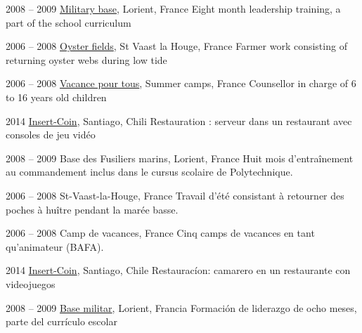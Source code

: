 \item[Commandos Marine]{2008 -- 2009}
  {
  \href{http://www.defense.gouv.fr/marine/organisation/forces/fusiliers-marins-et-commandos/force-maritime-des-fusiliers-marins-et-commandos}{Military base}, Lorient, France
  }
  {Eight ­month leadership training, a part of the school curriculum}


\item[Ostreiculture]{2006 -- 2008}
  {
  \href{http://huitresdesaintvaast.fr/}{Oyster fields}, St Vaast la Houge, France
  }
  {Farmer work consisting of returning oyster webs during low tide}


\item[Counsellor]{2006 -- 2008}
  {
  \href{http://www.vacances-pour-tous.org/}{Vacance pour tous}, Summer camps, France
  }
  {Counsellor in charge of 6 to 16 years old children}


\item[Serveur-Barman]{2014}
	{
	\href{http://www.insertcoin.cl/}{Insert-Coin}, Santiago, Chili
  }
	{Restauration : serveur dans un restaurant avec consoles de jeu vidéo}

\item[Commandos Marine]{2008 -- 2009}
	{Base des Fusiliers marins, Lorient, France}
	{Huit mois d'entraînement au commandement inclus dans le cursus scolaire de Polytechnique.}


\item[Ostreiculture]{2006 -- 2008}
	{St-Vaast-la-Houge, France}
	{Travail d'été consistant à retourner des poches à huître pendant la marée basse.}


\item[Animateur]{2006 -- 2008}
	{Camp de vacances, France}
	{Cinq camps de vacances en tant qu'animateur (BAFA).}


\item[Camarero]{2014}
	{
	\href{http://www.insertcoin.cl/}{Insert-Coin}, Santiago, Chile
	}
	{Restauracíon: camarero en un restaurante con videojuegos}

\item[Commandos Marine]{2008 -- 2009}
	{
	\href{http://www.defense.gouv.fr/marine/organisation/forces/fusiliers-marins-et-commandos/force-maritime-des-fusiliers-marins-et-commandos}{Base militar}, Lorient, Francia
	}
	{Formación de liderazgo de ocho meses, parte del currículo escolar}


